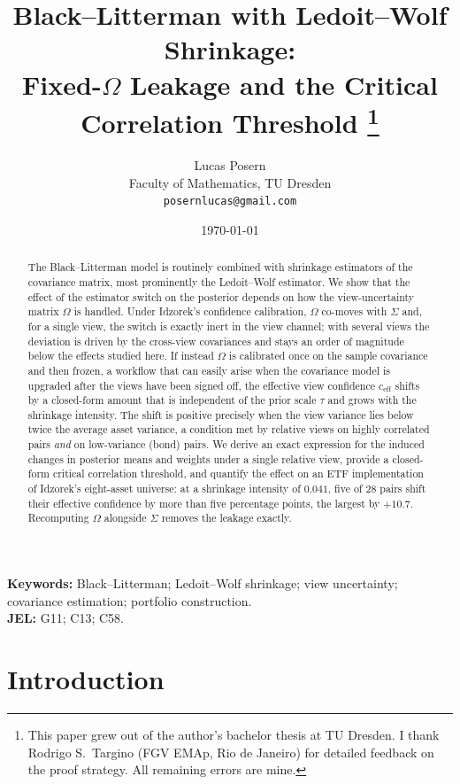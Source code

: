 \documentclass[a4paper,11pt]{article}
\title{Black--Litterman with Ledoit--Wolf Shrinkage:\\
Fixed-$\Omega$ Leakage and the Critical Correlation Threshold%
\thanks{This paper grew out of the author's bachelor thesis at TU Dresden.
I thank Rodrigo S.~Targino (FGV EMAp, Rio de Janeiro) for detailed feedback
on the proof strategy. All remaining errors are mine.}}
\author{Lucas Posern\\
\small Faculty of Mathematics, TU Dresden\\
\small \texttt{posernlucas@gmail.com}}
\date{\today}
\theoremstyle{plain}
\theoremstyle{definition}
\newcommand{\eff}{\mathrm{eff}}
\begin{document}
\maketitle

\begin{abstract}
\noindent
The Black--Litterman model is routinely combined with shrinkage estimators
of the covariance matrix, most prominently the Ledoit--Wolf estimator.
We show that the effect of the estimator switch on the posterior depends
on how the view-uncertainty matrix $\Omega$ is handled. Under
Idzorek's confidence calibration, $\Omega$ co-moves with $\Sigma$ and, for
a single view, the switch is exactly inert in the view channel; with
several views the deviation is driven by the cross-view covariances and
stays an order of magnitude below the effects studied here. If instead
$\Omega$ is calibrated once on the sample covariance and then frozen, a
workflow that can easily arise when the covariance model is upgraded after
the views have been signed off, the effective view confidence
$c_{\eff}$ shifts by a closed-form amount that is independent of the prior
scale $\tau$ and grows with the shrinkage intensity. The shift is positive
precisely when the view variance lies below twice the average asset
variance, a condition met by relative views on highly correlated pairs
\emph{and} on low-variance (bond) pairs. We derive an exact expression for
the induced changes in posterior means and weights under a single relative
view, provide a closed-form critical correlation threshold, and quantify
the effect on an ETF implementation of Idzorek's eight-asset universe: at
a shrinkage intensity of $0.041$, five of 28 pairs shift their effective
confidence by more than five percentage points, the largest by $+10.7$.
Recomputing $\Omega$ alongside $\Sigma$ removes the leakage exactly.
\end{abstract}

\medskip
\noindent\textbf{Keywords:} Black--Litterman; Ledoit--Wolf shrinkage;
view uncertainty; covariance estimation; portfolio construction.\\
\textbf{JEL:} G11; C13; C58.

\section{Introduction}
\label{sec:intro}
\end{document}
